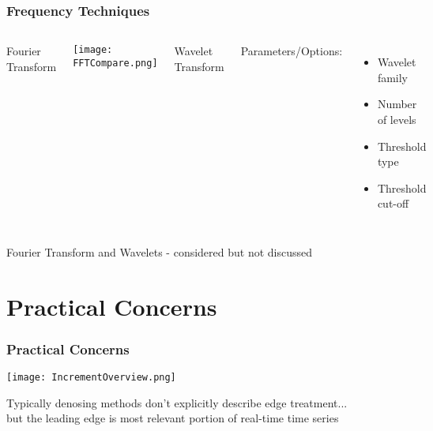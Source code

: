 \documentclass{beamer}
\begin{document}

\begin{frame}
\begin{center}
\frametitle{Frequency Techniques}

\begin{columns}[t]

\centering

Fourier Transform

\texttt{[image: FFTCompare.png]}

\centering

Wavelet Transform\\

\justifying

$ $\\

Parameters/Options:

\begin{itemize}

\item Wavelet family

\item Number of levels

\item Threshold type

\item Threshold cut-off

\end{itemize}

\end{columns}

$ $\\

$ $\\

Fourier Transform and Wavelets - considered but not discussed

\end{center}
\end{frame}

\section{Practical Concerns}

\begin{frame}
\begin{center}
\frametitle{Practical Concerns}

\texttt{[image: IncrementOverview.png]}

Typically denosing methods don't explicitly describe edge treatment...\\

$ $\\

but the leading edge is most relevant portion of real-time time series

\end{center}
\end{frame}
\end{document}

